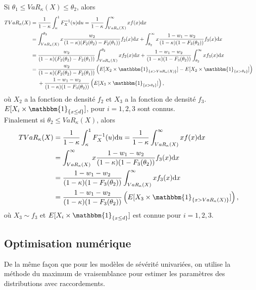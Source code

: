 	Si $ \theta_1 \leq VaR_{\kappa}(X) \leq \theta_2$, alors
	\begin{align*}
	TVaR_{\kappa}(X) &= \frac{1}{1-\kappa} \int_{\kappa}^{1} F_X^{-1}(u) \textrm{d}u =  \frac{1}{1-\kappa} \int_{VaR_{\kappa}(X)}^{\infty} x f(x) \textrm{d}x\\
	&=  \int_{VaR_{\kappa}(X)}^{\theta_2} x \frac{w_2}{(1-\kappa)(F_2(\theta_2)-F_2(\theta_1))}f_2(x) \textrm{d}x + \int_{\theta_2}^{\infty} x  \frac{1-w_1-w_2}{(1-\kappa)(1-F_3(\theta_2))} f_3(x) \textrm{d}x\\
	&= \frac{w_2}{(1-\kappa)(F_2(\theta_2)-F_2(\theta_1))} \int_{VaR_{\kappa}(X)}^{\theta_2} x f_2(x) \textrm{d}x + \frac{1-w_1-w_2}{(1-\kappa)(1-F_3(\theta_2))} \int_{\theta_2}^{\infty} x   f_3(x) \textrm{d}x\\
	&= \frac{w_2}{(1-\kappa)(F_2(\theta_2)-F_2(\theta_1))} \left(E[X_2 \times \mathbbm{1}_{\left\{ x > VaR_{\kappa}(X)  \right\}}]  - E[X_2 \times \mathbbm{1}_{\left\{ x > \theta_2\right\}}] \right)\\
	&\ \ \ \ +  \frac{1-w_1-w_2}{(1-\kappa)(1-F_3(\theta_2))} \left(E[X_3 \times \mathbbm{1}_{\left\{ x > \theta_2 \right\}}]\right),
	\end{align*}	
	où $X_2$ a la fonction de densité $f_2$ et $X_3$ a la fonction de densité $f_3$. $E[X_i \times \mathbbm{1}_{\left\{ x \leq d \right\}} ]$, pour $i=1,2,3$ sont connus.\\
	
	Finalement si $ \theta_2 \leq VaR_{\kappa}(X)$, alors
	\begin{align*}
	TVaR_{\kappa}(X) &= \frac{1}{1-\kappa} \int_{\kappa}^{1} F_X^{-1}(u) \textrm{d}u =  \frac{1}{1-\kappa} \int_{VaR_{\kappa}(X)}^{\infty} x f(x) \textrm{d}x\\
	&=  \int_{VaR_{\kappa}(X)}^{\infty} x  \frac{1-w_1-w_2}{(1-\kappa)(1-F_3(\theta_2))} f_3(x) \textrm{d}x\\
	&=  \frac{1-w_1-w_2}{(1-\kappa)(1-F_3(\theta_2))} \int_{VaR_{\kappa}(X)}^{\infty} x   f_3(x) \textrm{d}x\\
	&= \frac{1-w_1-w_2}{(1-\kappa)(1-F_3(\theta_2))} \left(  E[X_3 \times \mathbbm{1}_{\left\{ x > VaR_{\kappa}(X) \right\}}]\right),
	\end{align*}	
	où $X_3\sim f_3$ et $E[X_i \times \mathbbm{1}_{\left\{ x \leq d \right\}} ]$ est connue pour $i=1,2,3$.
	
	\subsection{Optimisation numérique}
	De la même façon que pour les modèles de sévérité univariées, on utilise la méthode du maximum de vraisemblance pour estimer les paramètres des distributions avec raccordements.\\
	
